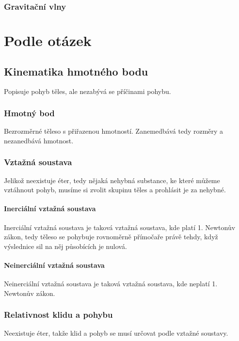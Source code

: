 \documentclass[titlepage]{book}
\begin{document}
\section{Gravitační vlny}

\part{Podle otázek}
\setcounter{chapter}{0}

\chapter{Kinematika hmotného bodu}
Popisuje pohyb těles, ale nezabývá se příčinami pohybu.
\section{Hmotný bod}
Bezrozměrné těleso s přiřazenou hmotností. Zanemedbává tedy rozměry a nezanedbává hmotnost.
\section{Vztažná soustava}
Jelikož neexistuje éter, tedy nějaká nehybná substance, ke které můžeme vztáhnout pohyb, musíme si zvolit skupinu těles a prohlásit je za nehybné.
\subsection{Inerciální vztažná soustava}
Inerciální vztažná soustava je taková vztažná soustava, kde platí 1. Newtonův zákon, tedy těleso se pohybuje rovnoměrně přímočaře právě tehdy, když výslednice sil na něj působících je nulová.
\subsection{Neinerciální vztažná soustava}
Neinerciální vztažná soustava je taková vztažná soustava, kde neplatí 1. Newtonův zákon.
\section{Relativnost klidu a pohybu}
Neexistuje éter, takže klid a pohyb se musí určovat podle vztažné soustavy.
\end{document}
